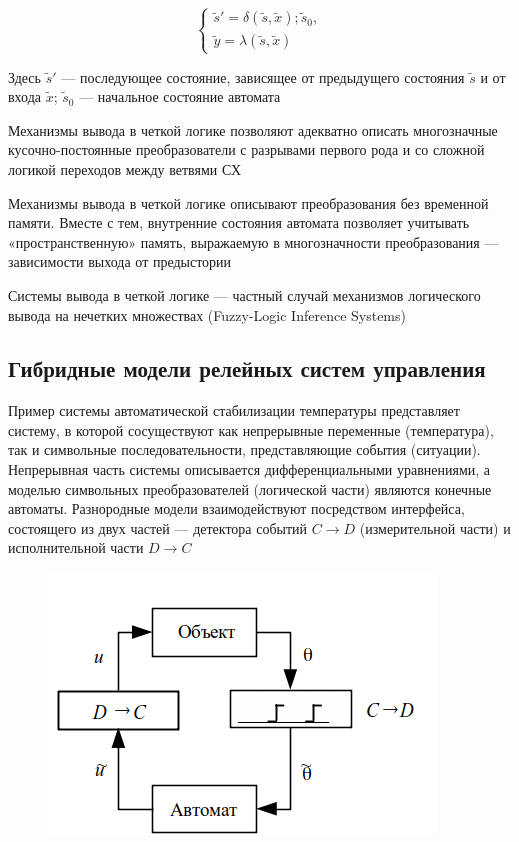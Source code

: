 $$
\begin{cases}
	\tilde{s}' = \delta(\tilde{s}, \tilde{x}); \tilde{s}_0, \\
	\tilde{y} = \lambda(\tilde{s}, \tilde{x})
\end{cases}
$$

Здесь $\tilde{s}'$ — последующее состояние, зависящее от предыдущего состояния $\tilde{s}$ и от входа $\tilde{x}$; $\tilde{s}_0$ — начальное состояние автомата

Механизмы вывода в четкой логике позволяют адекватно описать многозначные кусочно-постоянные преобразователи с разрывами первого рода и со сложной логикой переходов между ветвями СХ

Механизмы вывода в четкой логике описывают преобразования без временной памяти. Вместе с тем, внутренние состояния автомата позволяет учитывать «пространственную» память, выражаемую в многозначности преобразования — зависимости выхода от предыстории

Системы вывода в четкой логике — частный случай механизмов логического вывода на нечетких множествах (Fuzzy-Logic Inference Systems)

\subsection{Гибридные модели релейных систем управления}

Пример системы автоматической стабилизации температуры представляет систему, в которой сосуществуют как непрерывные переменные (температура), так и символьные последовательности, представляющие события (ситуации). Непрерывная часть системы описывается дифференциальными уравнениями, а моделью символьных преобразователей (логической части) являются конечные автоматы. Разнородные модели взаимодействуют посредством интерфейса, состоящего из двух частей — детектора событий $C \rightarrow D$ (измерительной части) и исполнительной части $D \rightarrow  C$

\begin{figure}[H]
	\centering
	\includegraphics[width=0.7\linewidth]{body/images/hybrid-system.png}
\end{figure}

